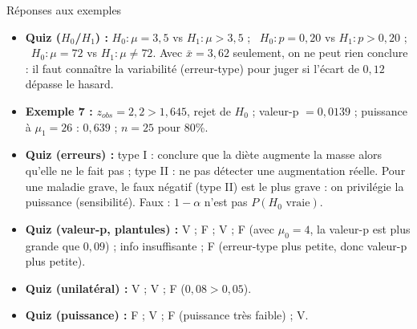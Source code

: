 \documentclass{BeamerTemplate}
\begin{document}
\begin{frame}[t]{Réponses aux exemples}
  \footnotesize
  \begin{itemize}\itemsep 1mm
    \item \textbf{Quiz ($H_0$/$H_1$) :} $H_0 : \mu = 3{,}5$ vs $H_1 : \mu > 3{,}5$ ; \ $H_0 : p = 0{,}20$ vs $H_1 : p > 0{,}20$ ; \ $H_0 : \mu = 72$ vs $H_1 : \mu \ne 72$. Avec $\bar{x} = 3{,}62$ seulement, on ne peut rien conclure : il faut connaître la variabilité (erreur-type) pour juger si l'écart de $0{,}12$ dépasse le hasard.
    \item \textbf{Exemple 7 :} $z_{obs} = 2{,}2 > 1{,}645$, rejet de $H_0$ ; valeur-p $= 0{,}0139$ ; puissance à $\mu_1 = 26$ : $0{,}639$ ; $n = 25$ pour 80\%.
    \item \textbf{Quiz (erreurs) :} type I : conclure que la diète augmente la masse alors qu'elle ne le fait pas ; type II : ne pas détecter une augmentation réelle. Pour une maladie grave, le faux négatif (type II) est le plus grave : on privilégie la puissance (sensibilité). Faux : $1-\alpha$ n'est pas $P(H_0 \text{ vraie})$.
    \item \textbf{Quiz (valeur-p, plantules) :} V ; F ; V ; F (avec $\mu_0 = 4$, la valeur-p est plus grande que $0{,}09$) ; info insuffisante ; F (erreur-type plus petite, donc valeur-p plus petite).
    \item \textbf{Quiz (unilatéral) :} V ; V ; F ($0{,}08 > 0{,}05$).
    \item \textbf{Quiz (puissance) :} F ; V ; F (puissance très faible) ; V.
  \end{itemize}
\end{frame}
\end{document}

